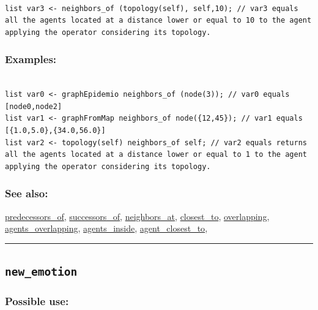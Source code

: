\documentclass[]{book}
\theoremstyle{definition}
\theoremstyle{definition}
\theoremstyle{definition}
\theoremstyle{remark}
\begin{document}
\begin{verbatim}
 
list var3 <- neighbors_of (topology(self), self,10); // var3 equals all the agents located at a distance lower or equal to 10 to the agent applying the operator considering its topology.
\end{verbatim}

\subsubsection{Examples:}\label{examples-254}

\begin{verbatim}
 
list var0 <- graphEpidemio neighbors_of (node(3)); // var0 equals [node0,node2] 
list var1 <- graphFromMap neighbors_of node({12,45}); // var1 equals [{1.0,5.0},{34.0,56.0}] 
list var2 <- topology(self) neighbors_of self; // var2 equals returns all the agents located at a distance lower or equal to 1 to the agent applying the operator considering its topology.
\end{verbatim}

\subsubsection{See also:}\label{see-also-147}

\href{operators-n-to-r.html\#predecessors_of}{predecessors\_of},
\href{operators-s-to-z.html\#successors_of}{successors\_of},
\href{operators-n-to-r.html\#neighbors_at}{neighbors\_at},
\href{operators-b-to-c.html\#closest_to}{closest\_to},
\href{operators-n-to-r.html\#overlapping}{overlapping},
\href{operators-a-to-a.html\#agents_overlapping}{agents\_overlapping},
\href{operators-a-to-a.html\#agents_inside}{agents\_inside},
\href{operators-a-to-a.html\#agent_closest_to}{agent\_closest\_to},

\begin{center}\rule{0.5\linewidth}{\linethickness}\end{center}

\subsection{\texorpdfstring{\texttt{new\_emotion}}{new\_emotion}}\label{new_emotion}

\subsubsection{Possible use:}\label{possible-use-368}
\end{document}
